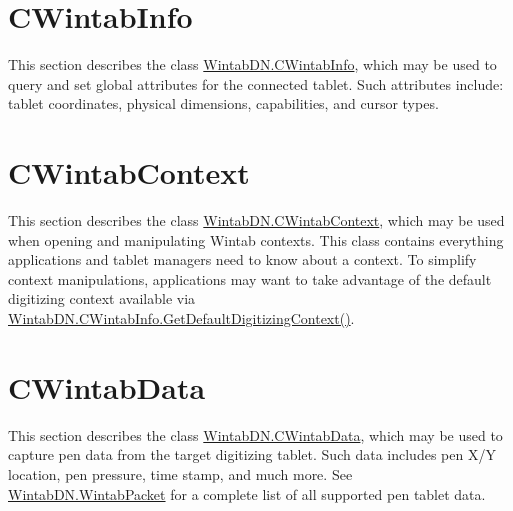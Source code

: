 \hypertarget{page3_cwintabinfo_sec}{}\section{C\+Wintab\+Info}\label{page3_cwintabinfo_sec}
This section describes the class \mbox{\hyperlink{class_wintab_d_n_1_1_c_wintab_info}{Wintab\+D\+N.\+C\+Wintab\+Info}}, which may be used to query and set global attributes for the connected tablet. Such attributes include\+: tablet coordinates, physical dimensions, capabilities, and cursor types.\hypertarget{page3_cwintabcontext_sec}{}\section{C\+Wintab\+Context}\label{page3_cwintabcontext_sec}
This section describes the class \mbox{\hyperlink{class_wintab_d_n_1_1_c_wintab_context}{Wintab\+D\+N.\+C\+Wintab\+Context}}, which may be used when opening and manipulating Wintab contexts. This class contains everything applications and tablet managers need to know about a context. To simplify context manipulations, applications may want to take advantage of the default digitizing context available via \mbox{\hyperlink{class_wintab_d_n_1_1_c_wintab_info_a7bceb028e21a4c94d44ba0e3b8a75fa4}{Wintab\+D\+N.\+C\+Wintab\+Info.\+Get\+Default\+Digitizing\+Context()}}.\hypertarget{page3_cwintabdata_sec}{}\section{C\+Wintab\+Data}\label{page3_cwintabdata_sec}
This section describes the class \mbox{\hyperlink{class_wintab_d_n_1_1_c_wintab_data}{Wintab\+D\+N.\+C\+Wintab\+Data}}, which may be used to capture pen data from the target digitizing tablet. Such data includes pen X/Y location, pen pressure, time stamp, and much more. See \mbox{\hyperlink{struct_wintab_d_n_1_1_wintab_packet}{Wintab\+D\+N.\+Wintab\+Packet}} for a complete list of all supported pen tablet data. 